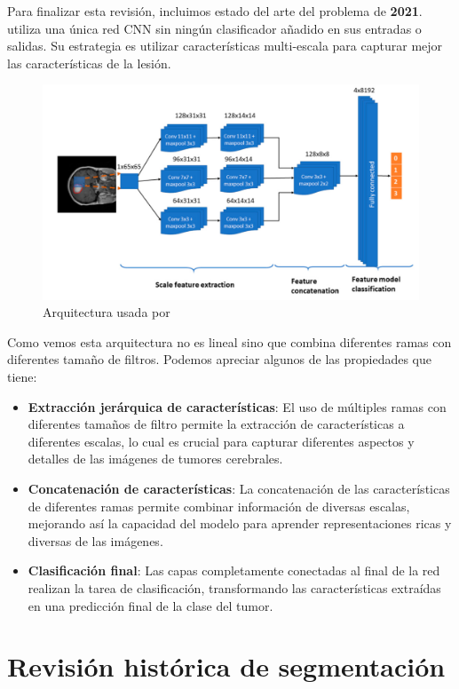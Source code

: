 Para finalizar esta revisión, incluimos estado del arte del problema de \textbf{2021}. \cite{diaz2021deep} utiliza una única red CNN sin ningún clasificador añadido en sus entradas o salidas. Su estrategia es utilizar características multi-escala para capturar mejor las características de la lesión.

\begin{figure}[H]
	\centering
	\includegraphics[width=1.0\linewidth]{imagenes/diaz2021deep.png}
	\caption{Arquitectura usada por \cite{diaz2021deep}}
\end{figure}

Como vemos esta arquitectura no es lineal sino que combina diferentes ramas con diferentes tamaño de filtros. Podemos apreciar algunos de las propiedades que tiene:

\begin{itemize}
	\item \textbf{Extracción jerárquica de características}: El uso de múltiples ramas con diferentes tamaños de filtro permite la extracción de características a diferentes escalas, lo cual es crucial para capturar diferentes aspectos y detalles de las imágenes de tumores cerebrales.
	\item \textbf{Concatenación de características}: La concatenación de las características de diferentes ramas permite combinar información de diversas escalas, mejorando así la capacidad del modelo para aprender representaciones ricas y diversas de las imágenes.
	\item \textbf{Clasificación final}: Las capas completamente conectadas al final de la red realizan la tarea de clasificación, transformando las características extraídas en una predicción final de la clase del tumor.
\end{itemize}


\section{Revisión histórica de segmentación}

